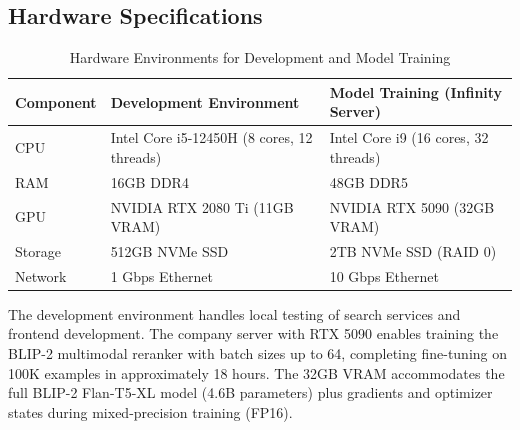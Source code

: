 \subsection{Hardware Specifications}

\begin{table}[H]
\centering
\caption{Hardware Environments for Development and Model Training}
\label{tab:hardware}
\renewcommand{\arraystretch}{1.3}
\begin{tabular}{|l|l|l|}
\hline
\textbf{Component} & \textbf{Development Environment} & \textbf{Model Training (Infinity Server)} \\
\hline
CPU & Intel Core i5-12450H (8 cores, 12 threads) & Intel Core i9 (16 cores, 32 threads) \\
\hline
RAM & 16GB DDR4 & 48GB DDR5 \\
\hline
GPU & NVIDIA RTX 2080 Ti (11GB VRAM) & NVIDIA RTX 5090 (32GB VRAM) \\
\hline
Storage & 512GB NVMe SSD & 2TB NVMe SSD (RAID 0) \\
\hline
Network & 1 Gbps Ethernet & 10 Gbps Ethernet \\
\hline
\end{tabular}
\end{table}

The development environment handles local testing of search services and frontend development. The company server with RTX 5090 enables training the BLIP-2 multimodal reranker with batch sizes up to 64, completing fine-tuning on 100K examples in approximately 18 hours. The 32GB VRAM accommodates the full BLIP-2 Flan-T5-XL model (4.6B parameters) plus gradients and optimizer states during mixed-precision training (FP16).

\clearpage
